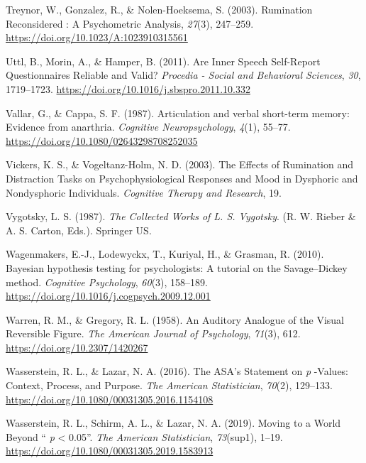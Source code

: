 \documentclass[a4paper,12pt,twoside,openright,oldfontcommands]{memoir}
\begin{document}
\leavevmode\hypertarget{ref-treynor_rumination_2003}{}%
Treynor, W., Gonzalez, R., \& Nolen-Hoeksema, S. (2003). Rumination Reconsidered : A Psychometric Analysis, \emph{27}(3), 247--259. \url{https://doi.org/10.1023/A:1023910315561}

\leavevmode\hypertarget{ref-Uttl2011}{}%
Uttl, B., Morin, A., \& Hamper, B. (2011). Are Inner Speech Self-Report Questionnaires Reliable and Valid? \emph{Procedia - Social and Behavioral Sciences}, \emph{30}, 1719--1723. \url{https://doi.org/10.1016/j.sbspro.2011.10.332}

\leavevmode\hypertarget{ref-vallar_articulation_1987}{}%
Vallar, G., \& Cappa, S. F. (1987). Articulation and verbal short-term memory: Evidence from anarthria. \emph{Cognitive Neuropsychology}, \emph{4}(1), 55--77. \url{https://doi.org/10.1080/02643298708252035}

\leavevmode\hypertarget{ref-vickers_effects_2003}{}%
Vickers, K. S., \& Vogeltanz-Holm, N. D. (2003). The Effects of Rumination and Distraction Tasks on Psychophysiological Responses and Mood in Dysphoric and Nondysphoric Individuals. \emph{Cognitive Therapy and Research}, 19.

\leavevmode\hypertarget{ref-vygotsky_collected_1987}{}%
Vygotsky, L. S. (1987). \emph{The Collected Works of L. S. Vygotsky}. (R. W. Rieber \& A. S. Carton, Eds.). Springer US.

\leavevmode\hypertarget{ref-wagenmakers_bayesian_2010}{}%
Wagenmakers, E.-J., Lodewyckx, T., Kuriyal, H., \& Grasman, R. (2010). Bayesian hypothesis testing for psychologists: A tutorial on the Savage--Dickey method. \emph{Cognitive Psychology}, \emph{60}(3), 158--189. \url{https://doi.org/10.1016/j.cogpsych.2009.12.001}

\leavevmode\hypertarget{ref-warren_auditory_1958}{}%
Warren, R. M., \& Gregory, R. L. (1958). An Auditory Analogue of the Visual Reversible Figure. \emph{The American Journal of Psychology}, \emph{71}(3), 612. \url{https://doi.org/10.2307/1420267}

\leavevmode\hypertarget{ref-wasserstein_asas_2016}{}%
Wasserstein, R. L., \& Lazar, N. A. (2016). The ASA's Statement on \emph{p} -Values: Context, Process, and Purpose. \emph{The American Statistician}, \emph{70}(2), 129--133. \url{https://doi.org/10.1080/00031305.2016.1154108}

\leavevmode\hypertarget{ref-wasserstein_moving_2019}{}%
Wasserstein, R. L., Schirm, A. L., \& Lazar, N. A. (2019). Moving to a World Beyond `` \emph{p} \textless{} 0.05''. \emph{The American Statistician}, \emph{73}(sup1), 1--19. \url{https://doi.org/10.1080/00031305.2019.1583913}
\end{document}
